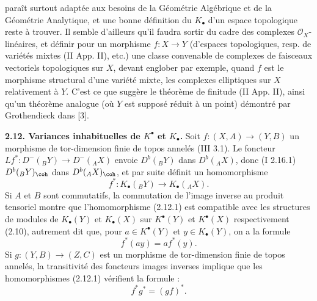 paraît surtout adaptée aux besoins de la Géométrie Algébrique et de la Géométrie Analytique, et une bonne définition du \(K_{\bullet}\) d'un espace topologique reste à trouver. Il semble d'ailleurs qu'il faudra sortir du cadre des complexes \(\mathcal O_X\)-linéaires, et définir pour un morphisme \(f:X\to Y\) (d'espaces topologiques, resp. de variétés mixtes (II App. II), etc.) une classe convenable de complexes de faisceaux vectoriels topologiques sur \(X\), devant englober par exemple, quand \(f\) est le morphisme structural d'une variété mixte, les complexes elliptiques sur \(X\) relativement à \(Y\). C'est ce que suggère le théorème de finitude (II App. II), ainsi qu'un théorème analogue (où \(Y\) est supposé réduit à un point) démontré par Grothendieck dans [3].

\textbf{2.12. Variances inhabituelles de \(K^{\bullet}\) et \(K_{\bullet}\).} Soit \(f:(X,A)\longrightarrow(Y,B)\) un morphisme de tor-dimension finie de topos annelés (III 3.1). Le foncteur \(Lf^*:D^-({}_B Y)\longrightarrow D^-({}_A X)\) envoie \(D^b({}_B Y)\) dans \(D^b({}_A X)\), donc (I 2.16.1) \(D^b({}_B Y)_{\coh}\) dans \(D^b({}_A X)_{\coh}\), et par suite définit un homomorphisme
\begin{equation}\tag{2.12.1}
 f^*:K_\bullet({}_B Y)\longrightarrow K_\bullet({}_A X).
\end{equation}
Si \(A\) et \(B\) sont commutatifs, la commutation de l'image inverse au produit tensoriel montre que l'homomorphisme (2.12.1) est compatible avec les structures de modules de \(K_{\bullet}(Y)\) et \(K_{\bullet}(X)\) sur \(K^{\bullet}(Y)\) et \(K^{\bullet}(X)\) respectivement (2.10), autrement dit que, pour \(a\in K^{\bullet}(Y)\) et \(y\in K_{\bullet}(Y)\), on a la formule
\begin{equation}\tag{2.12.2}
 f^*(ay)=a f^*(y).
\end{equation}
Si \(g:(Y,B)\to(Z,C)\) est un morphisme de tor-dimension finie de topos annelés, la transitivité des foncteurs images inverses implique que les homomorphismes (2.12.1) vérifient la formule :
\begin{equation}\tag{2.12.1.1}
 f^*g^*=(gf)^*.
\end{equation}

